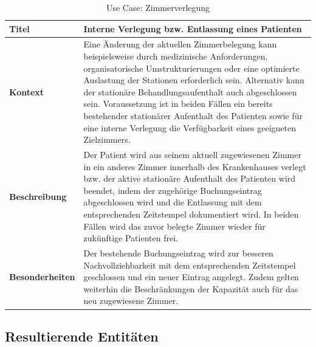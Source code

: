 \begin{table}[H]
\centering
\renewcommand{\arraystretch}{1.4}
\begin{tabularx}{\textwidth}{|p{4cm}|X|}
\hline
\textbf{Titel} & \textbf{Interne Verlegung bzw. Entlassung eines Patienten} \\ \hline

\textbf{Kontext} & 
Eine Änderung der aktuellen Zimmerbelegung kann beispielsweise durch medizinische Anforderungen, organisatorische Umstrukturierungen oder eine optimierte Auslastung der Stationen erforderlich sein.
Alternativ kann der stationäre Behandlungsaufenthalt auch abgeschlossen sein.
Voraussetzung ist in beiden Fällen ein bereits bestehender stationärer Aufenthalt des Patienten sowie für eine interne Verlegung die Verfügbarkeit eines geeigneten Zielzimmers. \\ \hline

\textbf{Beschreibung} & 
Der Patient wird aus seinem aktuell zugewiesenen Zimmer in ein anderes Zimmer innerhalb des Krankenhauses verlegt bzw. der aktive stationäre Aufenthalt des Patienten wird beendet, indem der zugehörige Buchungseintrag abgeschlossen wird und die Entlassung mit dem entsprechenden Zeitstempel dokumentiert wird.
In beiden Fällen wird das zuvor belegte Zimmer wieder für zukünftige Patienten frei.  \\ \hline

\textbf{Besonderheiten} & 
Der bestehende Buchungseintrag wird zur besseren Nachvollziehbarkeit mit dem entsprechenden Zeitstempel geschlossen und ein neuer Eintrag angelegt. 
Zudem gelten weiterhin die Beschränkungen der Kapazität auch für das neu zugewiesene Zimmer.\\ \hline

\end{tabularx}
\caption{Use Case: Zimmerverlegung}
\end{table}

\newpage

\subsection*{Resultierende Entitäten}

